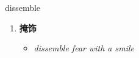 
\begin{frame}
{\huge dissemble}
\begin{center}
\begin{enumerate}\Large
  \item \textbf{掩饰}
  \begin{itemize}
    \item \em{\Large{dissemble fear with a smile}}
  \end{itemize}
\end{enumerate}
\end{center}
\end{frame}

